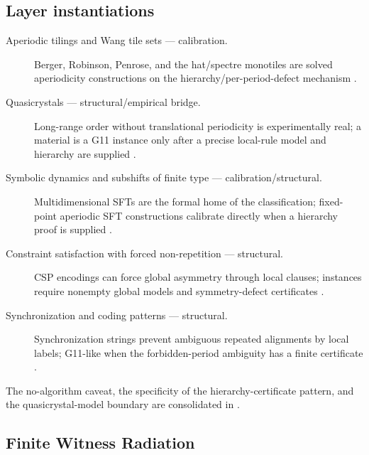 \documentclass[11pt]{article}
\newcommand{\lawGTwelve}{Finite Witness Radiation}
\theoremstyle{definition}
\begin{document}
\subsection*{Layer instantiations}\label{layer-inst:G11}
\begin{description}
  \item[Aperiodic tilings and Wang tile sets --- calibration.] Berger, Robinson, Penrose, and the
    hat/spectre monotiles are solved aperiodicity constructions on the hierarchy/per-period-defect
    mechanism \citep{Berger1966,Robinson1971,Penrose1974,SmithEtAl2023Hat,SmithEtAl2023Spectre}.
  \item[Quasicrystals --- structural/empirical bridge.] Long-range order without translational
    periodicity is experimentally real; a material is a G11 instance only after a precise local-rule
    model and hierarchy are supplied \citep{ShechtmanEtAl1984,Senechal1995}.
  \item[Symbolic dynamics and subshifts of finite type --- calibration/structural.]
    Multidimensional SFTs are the formal home of the classification; fixed-point aperiodic SFT
    constructions calibrate directly when a hierarchy proof is supplied
    \citep{LindMarcus1995,DurandRomashchenkoShen}.
  \item[Constraint satisfaction with forced non-repetition --- structural.] CSP encodings can force
    global asymmetry through local clauses; instances require nonempty global models and
    symmetry-defect certificates \citep{Dechter2003}.
  \item[Synchronization and coding patterns --- structural.] Synchronization strings prevent
    ambiguous repeated alignments by local labels; G11-like when the forbidden-period ambiguity has a
    finite certificate \citep{HaeuplerShahrasbi2017}.
\end{description}

The no-algorithm caveat, the specificity of the hierarchy-certificate pattern, and the
quasicrystal-model boundary are consolidated in .

\subsection{\lawGTwelve}\label{sec:clusterD:g12}
\end{document}
